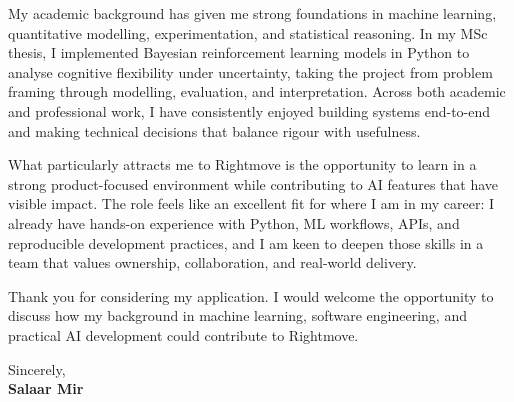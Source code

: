 \documentclass[a4paper,10pt]{article}
\begin{document}
My academic background has given me strong foundations in machine learning, quantitative modelling, experimentation, and statistical reasoning. In my MSc thesis, I implemented Bayesian reinforcement learning models in Python to analyse cognitive flexibility under uncertainty, taking the project from problem framing through modelling, evaluation, and interpretation. Across both academic and professional work, I have consistently enjoyed building systems end-to-end and making technical decisions that balance rigour with usefulness.

What particularly attracts me to Rightmove is the opportunity to learn in a strong product-focused environment while contributing to AI features that have visible impact. The role feels like an excellent fit for where I am in my career: I already have hands-on experience with Python, ML workflows, APIs, and reproducible development practices, and I am keen to deepen those skills in a team that values ownership, collaboration, and real-world delivery.

Thank you for considering my application. I would welcome the opportunity to discuss how my background in machine learning, software engineering, and practical AI development could contribute to Rightmove.

\vspace{6mm}

Sincerely, \\
\textbf{Salaar Mir}
\end{document}
